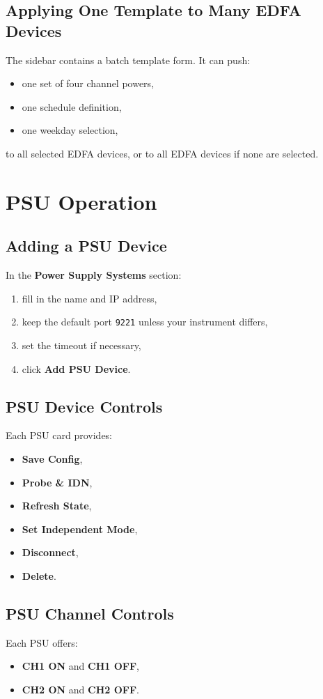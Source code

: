 \documentclass[11pt,a4paper]{article}
\begin{document}
\subsection{Applying One Template to Many EDFA Devices}
The sidebar contains a batch template form. It can push:
\begin{itemize}[leftmargin=1.5em]
    \item one set of four channel powers,
    \item one schedule definition,
    \item one weekday selection,
\end{itemize}
to all selected EDFA devices, or to all EDFA devices if none are selected.

\section{PSU Operation}
\subsection{Adding a PSU Device}
In the \textbf{Power Supply Systems} section:
\begin{enumerate}[leftmargin=1.5em]
    \item fill in the name and IP address,
    \item keep the default port \texttt{9221} unless your instrument differs,
    \item set the timeout if necessary,
    \item click \textbf{Add PSU Device}.
\end{enumerate}

\subsection{PSU Device Controls}
Each PSU card provides:
\begin{itemize}[leftmargin=1.5em]
    \item \textbf{Save Config},
    \item \textbf{Probe \& IDN},
    \item \textbf{Refresh State},
    \item \textbf{Set Independent Mode},
    \item \textbf{Disconnect},
    \item \textbf{Delete}.
\end{itemize}

\subsection{PSU Channel Controls}
Each PSU offers:
\begin{itemize}[leftmargin=1.5em]
    \item \textbf{CH1 ON} and \textbf{CH1 OFF},
    \item \textbf{CH2 ON} and \textbf{CH2 OFF}.
\end{itemize}
\end{document}
